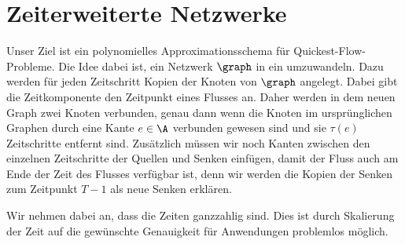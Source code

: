 \section{Zeiterweiterte Netzwerke}

Unser Ziel ist ein polynomielles Approximationsschema für Quickest-Flow-Probleme.
Die Idee dabei ist, ein Netzwerk $\graph$ in ein 
umzuwandeln. Dazu werden für jeden Zeitschritt Kopien der Knoten von $\graph$
angelegt. Dabei gibt die Zeitkomponente den Zeitpunkt eines Flusses an. Daher
werden in dem neuen Graph zwei Knoten verbunden, genau dann wenn die Knoten
im ursprünglichen Graphen durch eine Kante $e \in \A$ verbunden gewesen sind und
sie $\tau(e)$ Zeitschritte entfernt sind. Zusätzlich müssen wir noch Kanten
zwischen den einzelnen Zeitschritte der Quellen und Senken einfügen, damit
der Fluss auch am Ende der Zeit des Flusses verfügbar ist, denn wir werden
die Kopien der Senken zum Zeitpunkt $T-1$ als neue Senken erklären.

Wir nehmen dabei an, dass die Zeiten ganzzahlig sind. Dies ist durch Skalierung
der Zeit auf die gewünschte Genauigkeit für Anwendungen problemlos möglich.

